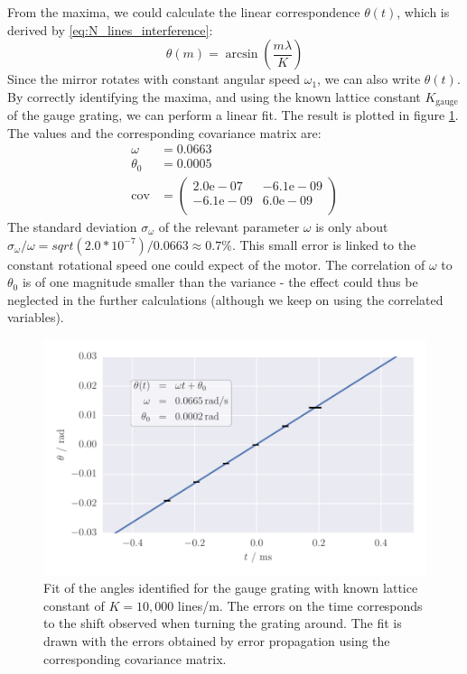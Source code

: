 From the maxima, we could calculate the linear correspondence $\theta(t)$, 
which is derived by \ref{eq:N_lines_interference}:
\begin{equation}
    \theta(m) = \arcsin\left(\frac{m \lambda}{K}\right)
\end{equation}
Since the mirror rotates with constant angular speed $\omega_1$, we can 
also write $\theta(t)$. By correctly identifying the maxima, and using the 
known lattice constant $K_\mathrm{gauge}$ of the gauge grating, we can perform a linear fit.
The result is plotted in figure \ref{fig:calibrate_fit}. The values and the corresponding 
covariance matrix are: 
\begin{align}
	\omega &= 0.0663 \\
	\theta_0 &= 0.0005 \\
	\mathrm{cov} &=
	\begin{pmatrix}
		2.0\mathrm{e}-07 &-6.1\mathrm{e}-09 \\
		-6.1\mathrm{e}-09 &6.0\mathrm{e}-09 \\
	\end{pmatrix} 
\end{align}
The standard deviation $\sigma_\omega$ of the relevant parameter $\omega$ is only about 
$\sigma_\omega / \omega = sqrt(2.0 * 10^{-7}) / 0.0663 \approx 0.7 \%$. 
This small error is linked to the constant rotational speed 
one could expect of the motor. The correlation of $\omega$ to $\theta_0$ is of one magnitude smaller 
than the variance - the effect could thus be neglected in the further calculations (although we keep 
    on using the correlated variables).

\begin{figure}[htpb]
    \centering
    \includegraphics[width=1.0\linewidth]{figures/calibrate_fit}
    \caption{
        Fit of the angles identified for the gauge grating with known 
        lattice constant of $K = 10,000$ lines/m. The errors on the time corresponds to the
        shift observed when turning the grating around. The fit is drawn with the errors obtained 
        by error propagation using the corresponding covariance matrix.
        }
    \label{fig:calibrate_fit}
\end{figure}

